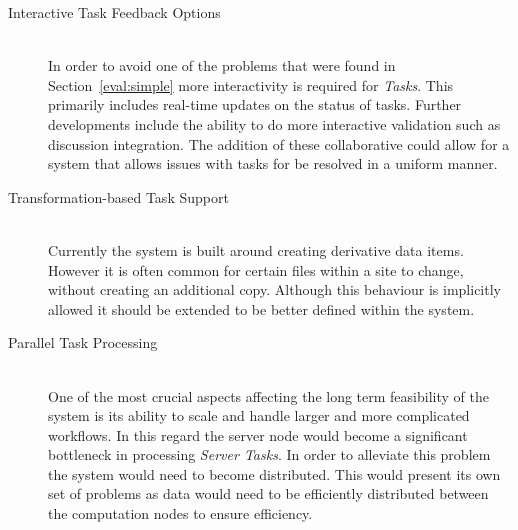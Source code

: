 \documentclass[12pt,a4paper]{report}
\begin{document}
\begin{description}
\item[Interactive Task Feedback Options]\hfill \\
In order to avoid one of the problems that were found in Section~\ref{eval:simple}
more interactivity is required for \emph{Tasks}. This primarily includes
real-time updates on the status of tasks. Further developments include the
ability to do more interactive validation such as discussion integration.
The addition of these collaborative could allow for a system that allows issues
with tasks for be resolved in a uniform manner\cite{guimaraes1998integration}.
\item[Transformation-based Task Support]\hfill \\
Currently the system is built around creating derivative data items. However it
is often common for certain files within a site to change, without creating an
additional copy. Although this behaviour is implicitly allowed it should be
extended to be better defined within the system.
\item[Parallel Task Processing] \hfill \\
One of the most crucial aspects affecting the long term feasibility of the
system is its ability to scale and handle larger and more complicated workflows.
In this regard the server node would become a significant bottleneck in
processing \emph{Server Tasks}. In order to alleviate this problem the system
would need to become distributed. This would present its own set of problems
as data would need to be efficiently distributed between the computation nodes
to ensure efficiency.

\end{description}

{}

\appendix

\end{document}
